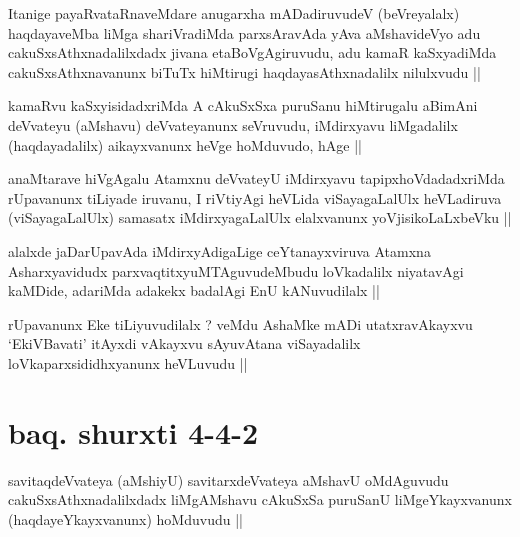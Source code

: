 
\begin{artha}
Itanige payaRvataRnaveMdare anugarxha mADadiruvudeV (beVreyalalx)
haqdayaveMba liMga shariVradiMda parxsAravAda yAva aMshavideVyo adu
cakuSxsAthxnadalilxdadx jivana etaBoVgAgiruvudu, adu kamaR kaSxyadiMda
cakuSxsAthxnavanunx biTuTx hiMtirugi haqdayasAthxnadalilx nilulxvudu ||
\end{artha}


\begin{artha}
kamaRvu kaSxyisidadxriMda A cAkuSxSxa puruSanu hiMtirugalu aBimAni
deVvateyu (aMshavu) deVvateyanunx seVruvudu, iMdirxyavu liMgadalilx
(haqdayadalilx) aikayxvanunx heVge hoMduvudo, hAge ||  
\end{artha}

\begin{artha}
anaMtarave hiVgAgalu Atamxnu deVvateyU iMdirxyavu tapipxhoVdadadxriMda
rUpavanunx tiLiyade iruvanu, I riVtiyAgi heVLida viSayagaLalUlx
heVLadiruva (viSayagaLalUlx) samasatx iMdirxyagaLalUlx elalxvanunx
yoVjisikoLaLxbeVku ||
\end{artha}

\begin{artha}
alalxde jaDarUpavAda iMdirxyAdigaLige ceYtanayxviruva Atamxna
Asharxyavidudx parxvaqtitxyuMTAguvudeMbudu loVkadalilx niyatavAgi
kaMDide, adariMda adakekx badalAgi EnU kANuvudilalx ||
\end{artha}

\begin{artha}
rUpavanunx Eke tiLiyuvudilalx ? veMdu AshaMke mADi utatxravAkayxvu
`EkiVBavati' itAyxdi vAkayxvu sAyuvAtana viSayadalilx
loVkaparxsididhxyanunx heVLuvudu ||
\end{artha}

\section*{baq. shurxti 4-4-2}

\begin{artha}
savitaqdeVvateya (aMshiyU) savitarxdeVvateya aMshavU oMdAguvudu
cakuSxsAthxnadalilxdadx liMgAMshavu cAkuSxSa puruSanU liMgeYkayxvanunx
(haqdayeYkayxvanunx) hoMduvudu ||
\end{artha}


